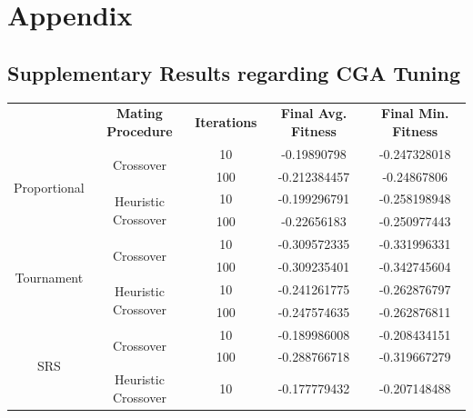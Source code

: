\documentclass[10pt]{article}
\begin{document}

\newpage
\section{Appendix}
\subsection{Supplementary Results regarding CGA Tuning}
\label{sec:CGA_tuning_results}
\begin{table}[H]
    \centering
    \begin{tabular}{|*{5}{c|}}
        \hline
        \renewcommand{\arraystretch}{1.5}
        \multirow{2}{*}{\textbf{Selection Method}} & \multirow{2}{*}{\textbf{Mating Procedure}} & \multirow{2}{*}{\textbf{Iterations}} & \multirow{2}{*}{\textbf{Final Avg. Fitness}} & \multirow{2}{*}{\textbf{Final Min. Fitness}} \\
        & & & & \\
        \hline
        \multirow{4}{*}{Proportional} & \multirow{2}{*}{Crossover} & 10 & -0.19890798 & -0.247328018 \\
        & &\cellcolor{lightgray} 100 &\cellcolor{lightgray} -0.212384457 &\cellcolor{lightgray} -0.24867806 \\
        \cline{2-5}
        & \multirow{2}{*}{Heuristic Crossover} & 10 & -0.199296791 & -0.258198948 \\
        & &\cellcolor{lightgray} 100 &\cellcolor{lightgray} -0.22656183 & \cellcolor{lightgray} -0.250977443 \\
        \hline
        \multirow{4}{*}{Tournament} & \multirow{2}{*}{Crossover} & 10 & -0.309572335 & -0.331996331 \\
        & &\cellcolor{lightgray} 100 &\cellcolor{lightgray} -0.309235401 &\cellcolor{lightgray} -0.342745604 \\
        \cline{2-5}
        & \multirow{2}{*}{Heuristic Crossover} & 10 & -0.241261775 & -0.262876797 \\
        & &\cellcolor{lightgray} 100 &\cellcolor{lightgray} -0.247574635 &\cellcolor{lightgray} -0.262876811 \\
        \hline
        \multirow{4}{*}{SRS} & \multirow{2}{*}{Crossover} & 10 & -0.189986008 & -0.208434151 \\
        & &\cellcolor{lightgray} 100 &\cellcolor{lightgray} -0.288766718 &\cellcolor{lightgray} -0.319667279 \\
        \cline{2-5}
        & \multirow{2}{*}{Heuristic Crossover} & 10 & -0.177779432 & -0.207148488 \\

\end{tabular}
\end{table}
\end{document}
